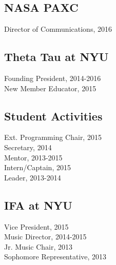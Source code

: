 \documentclass[]{deedy-resume-openfont}
\begin{document}
\begin{minipage}[t]{0.33\textwidth}
\subsection{NASA PAXC}
Director of Communications, 2016\\
\sectionsep

\subsection{Theta Tau at NYU}

Founding President, 2014-2016 \\
New Member Educator, 2015 \\
\sectionsep

\subsection{Student Activities}
Ext. Programming Chair, 2015\\
Secretary, 2014 \\
Mentor, 2013-2015\\
Intern/Captain, 2015\\
Leader, 2013-2014
\sectionsep

\subsection{IFA at NYU}
Vice President, 2015\\
Music Director, 2014-2015\\
Jr. Music Chair, 2013\\
Sophomore Representative, 2013

\sectionsep



%
%

\end{minipage} 
\hfill
\end{document}

